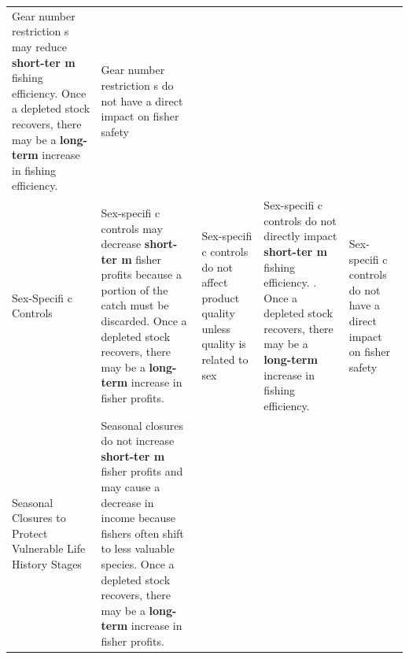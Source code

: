 \documentclass[]{book}
\begin{document}
\begin{longtable}[]{@{}lllll@{}}
\begin{minipage}[t]{0.17\columnwidth}
Gear number restriction s may reduce \textbf{short-ter m} fishing
efficiency. Once a depleted stock recovers, there may be a
\textbf{long-term } increase in fishing efficiency.\strut
\end{minipage} & \begin{minipage}[t]{0.17\columnwidth}\raggedright\strut
Gear number restriction s do not have a direct impact on fisher
safety\strut
\end{minipage}\tabularnewline
\begin{minipage}[t]{0.17\columnwidth}\raggedright\strut
Sex-Specifi c Controls\strut
\end{minipage} & \begin{minipage}[t]{0.17\columnwidth}\raggedright\strut
Sex-specifi c controls may decrease \textbf{short-ter m} fisher profits
because a portion of the catch must be discarded. Once a depleted stock
recovers, there may be a \textbf{long-term } increase in fisher
profits.\strut
\end{minipage} & \begin{minipage}[t]{0.17\columnwidth}\raggedright\strut
Sex-specifi c controls do not affect product quality unless quality is
related to sex\strut
\end{minipage} & \begin{minipage}[t]{0.17\columnwidth}\raggedright\strut
Sex-specifi c controls do not directly impact \textbf{short-ter m}
fishing efficiency. . Once a depleted stock recovers, there may be a
\textbf{long-term } increase in fishing efficiency.\strut
\end{minipage} & \begin{minipage}[t]{0.17\columnwidth}\raggedright\strut
Sex-specifi c controls do not have a direct impact on fisher
safety\strut
\end{minipage}\tabularnewline
\begin{minipage}[t]{0.17\columnwidth}\raggedright\strut
Seasonal Closures to Protect Vulnerable Life History Stages\strut
\end{minipage} & \begin{minipage}[t]{0.17\columnwidth}\raggedright\strut
Seasonal closures do not increase \textbf{short-ter m} fisher profits
and may cause a decrease in income because fishers often shift to less
valuable species. Once a depleted stock recovers, there may be a
\textbf{long-term } increase in fisher profits.\strut
\end{minipage} & \begin{minipage}[t]{0.17\columnwidth}\raggedright\strut

\end{minipage}
\end{longtable}
\end{document}
